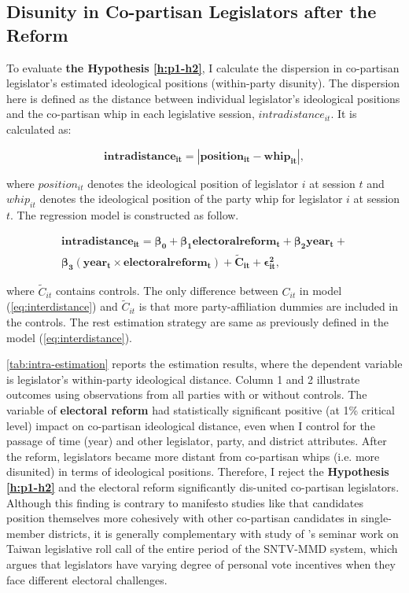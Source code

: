 \subsection*{Disunity in Co-partisan Legislators after the Reform\label{subsec:disunity-in-co-partisan}}

To evaluate \textbf{the Hypothesis \ref{h:p1-h2}}, I calculate the dispersion in co-partisan legislator's estimated ideological positions (within-party disunity). The dispersion here is defined as the distance between individual legislator's ideological positions and the co-partisan whip in each legislative session, $intradistance_{it}$. It is calculated as: 

\begin{equation}
\mathbf{intradistance_{it}=|position_{it}-whip_{it}|,}
\end{equation}

\noindent where $position_{it}$ denotes the ideological position of legislator $i$ at session $t$ and $whip_{it}$ denotes the ideological position of the party whip for legislator $i$ at session $t$. The regression model is constructed as follow.

\begin{align}
\mathbf{intradistance_{it}=\beta_{0}+\beta_{1}electoralreform_{t}+\beta_{2}year_{t}+ \nonumber } \\
\mathbf{\beta_{3}(year_{t}\times electoralreform_{t})+\tilde{C}_{it}+\epsilon_{it}^{2},\label{eq:intradistance}}
\end{align}

\noindent where $\tilde{C}_{it}$ contains controls. The only difference between $C_{it}$ in model (\autoref{eq:interdistance}) and $\tilde{C}_{it}$ is that more party-affiliation dummies are included in the controls. The rest estimation strategy are same as previously defined in the model (\autoref{eq:interdistance}).



\autoref{tab:intra-estimation} reports the estimation results, where the dependent variable is legislator's within-party ideological
distance. Column 1 and 2 illustrate outcomes using observations from all parties with or without controls. The variable of \textbf{electoral reform} had
statistically significant positive (at 1\% critical level) impact on co-partisan ideological distance, even when I control for the passage
of time (year) and other legislator, party, and district attributes. After the reform, legislators became more distant from co-partisan
whips (i.e. more disunited) in terms of ideological positions. Therefore, I reject the \textbf{Hypothesis \ref{h:p1-h2}} and the electoral reform significantly dis-united co-partisan legislators. Although this finding is contrary to manifesto studies like \citet{Catalinac2017} that candidates position themselves more cohesively with other co-partisan candidates in single-member districts, it is generally complementary with study of \citet{Jang2019}'s seminar work on Taiwan legislative roll call of the entire period of the SNTV-MMD system, which argues that legislators have varying degree of personal vote incentives when they face different electoral challenges. 

